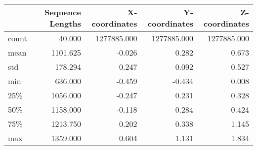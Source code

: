 \begin{tabular}{lrrrr}
\toprule
{} &  Sequence Lengths &  X-coordinates &  Y-coordinates &  Z-coordinates \\
\midrule
count &            40.000 &    1277885.000 &    1277885.000 &    1277885.000 \\
mean  &          1101.625 &         -0.026 &          0.282 &          0.673 \\
std   &           178.294 &          0.247 &          0.092 &          0.527 \\
min   &           636.000 &         -0.459 &         -0.434 &          0.008 \\
25\%   &          1056.000 &         -0.247 &          0.231 &          0.328 \\
50\%   &          1158.000 &         -0.118 &          0.284 &          0.424 \\
75\%   &          1213.750 &          0.202 &          0.338 &          1.145 \\
max   &          1359.000 &          0.604 &          1.131 &          1.834 \\
\bottomrule
\end{tabular}
